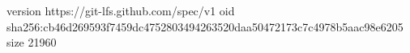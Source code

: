 version https://git-lfs.github.com/spec/v1
oid sha256:cb46d269593f7459dc4752803494263520daa50472173c7c4978b5aac98e6205
size 21960
